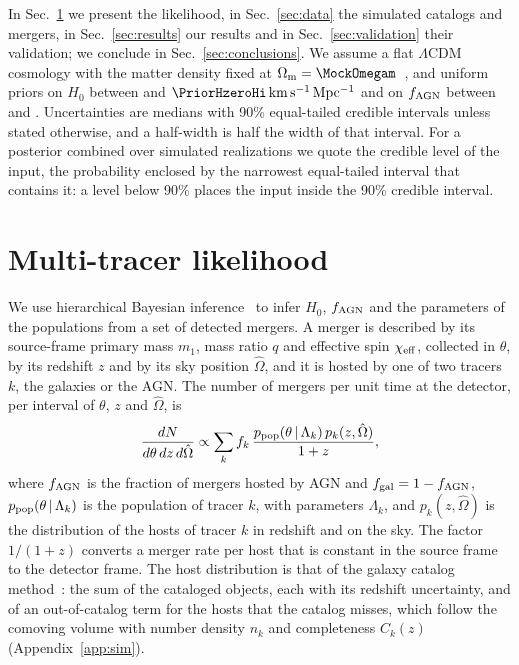 \documentclass[aps,prd,reprint,amsmath,amssymb,nofootinbib]{revtex4-2}
\newcommand{\kmsMpc}{\,{\rm km\,s^{-1}\,Mpc^{-1}}}
\newcommand{\fAGN}{f_{\rm AGN}}
\newcommand{\chieff}{\chi_{\rm eff}}
\begin{document}
In Sec.~\ref{sec:method} we present the likelihood, in Sec.~\ref{sec:data} the simulated catalogs and mergers, in Sec.~\ref{sec:results} our results and in Sec.~\ref{sec:validation} their validation; we conclude in Sec.~\ref{sec:conclusions}.
We assume a flat $\Lambda$CDM cosmology with the matter density fixed at $\Omega_{\rm m}=\MockOmegam$~\cite{Planck:2015fie}, and uniform priors on $H_0$ between \PriorHzeroLo{} and $\PriorHzeroHi\kmsMpc$ and on $\fAGN$ between \PriorfLo{} and \PriorfHi.
Uncertainties are medians with 90\% equal-tailed credible intervals unless stated otherwise, and a half-width is half the width of that interval.
For a posterior combined over simulated realizations we quote the credible level of the input, the probability enclosed by the narrowest equal-tailed interval that contains it: a level below 90\% places the input inside the 90\% credible interval.

\section{Multi-tracer likelihood}
\label{sec:method}

We use hierarchical Bayesian inference~\cite{Loredo:2004nn,Mandel:2018mve,Thrane:2018qnx,Vitale:2020aaz} to infer $H_0$, $\fAGN$ and the parameters of the populations from a set of detected mergers.
A merger is described by its source-frame primary mass $m_1$, mass ratio $q$ and effective spin $\chieff$, collected in $\theta$, by its redshift $z$ and by its sky position $\hat\Omega$, and it is hosted by one of two tracers $k$, the galaxies or the AGN.
The number of mergers per unit time at the detector, per interval of $\theta$, $z$ and $\hat\Omega$, is
\begin{equation}
\frac{dN}{d\theta\,dz\,d\hat\Omega}\propto\sum_{k}f_k\,\frac{p_{\rm pop}(\theta\,|\,\Lambda_k)\,p_k(z,\hat\Omega)}{1+z},
\label{eq:rate}
\end{equation}
where $f_{\rm AGN}$ is the fraction of mergers hosted by AGN and $f_{\rm gal}=1-\fAGN$, $p_{\rm pop}(\theta\,|\,\Lambda_k)$ is the population of tracer $k$, with parameters $\Lambda_k$, and $p_k(z,\hat\Omega)$ is the distribution of the hosts of tracer $k$ in redshift and on the sky.
The factor $1/(1+z)$ converts a merger rate per host that is constant in the source frame to the detector frame.
The host distribution is that of the galaxy catalog method~\cite{Gray:2019ksv,Gair:2022zsa,Gray:2023wgj,Mastrogiovanni:2023emh}: the sum of the cataloged objects, each with its redshift uncertainty, and of an out-of-catalog term for the hosts that the catalog misses, which follow the comoving volume with number density $n_k$ and completeness $C_k(z)$ (Appendix~\ref{app:sim}).
\end{document}
